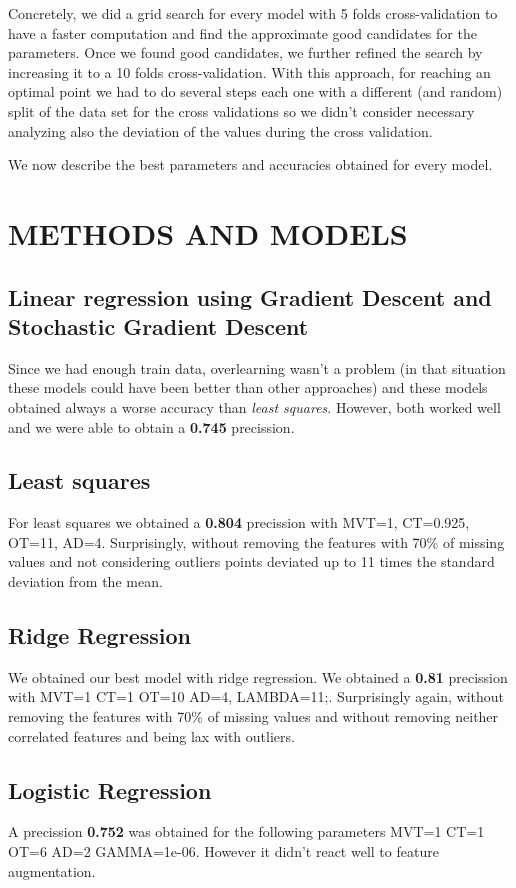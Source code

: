 \documentclass[10pt,conference,compsocconf]{IEEEtran}
\begin{document}
Concretely, we did a grid search for every model with 5 folds cross-validation to have a faster computation and find the approximate good candidates for the parameters. Once we found good candidates, we further refined the search by increasing it to a 10 folds cross-validation. With this approach, for reaching an optimal point we had to do several steps each one with a different (and random) split of the data set for the cross validations so we didn't consider necessary analyzing also the deviation of the values during the cross validation.

We now describe the best parameters and accuracies obtained for every model.

\section{METHODS AND MODELS}

\subsection{Linear regression using Gradient Descent and Stochastic Gradient Descent} 
Since we had enough train data, overlearning wasn't a problem (in that situation these models could have been better than other approaches) and these models obtained always a worse accuracy than \textit{least squares}. However, both worked well and we were able to obtain a \textbf{0.745} precission.

\subsection{Least squares}
For least squares we obtained a \textbf{0.804} precission with MVT=1, CT=0.925, OT=11, AD=4. Surprisingly, without removing the features with 70\% of missing values and not considering outliers points deviated up to 11 times the standard deviation from the mean.

\subsection{Ridge Regression}
We obtained our best model with ridge regression. We obtained a \textbf{0.81} precission with MVT=1 CT=1 OT=10 AD=4, LAMBDA=11;. Surprisingly again, without removing the features with 70\% of missing values and without removing neither correlated features and being lax with outliers.

\subsection{Logistic Regression}
A precission \textbf{0.752} was obtained for the following parameters MVT=1 CT=1 OT=6 AD=2 GAMMA=1e-06. However it didn't react well to feature augmentation.
\end{document}

